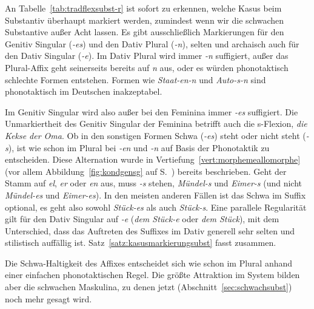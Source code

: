 An Tabelle~\ref{tab:tradflexsubst-r} ist sofort zu erkennen, welche Kasus beim Substantiv überhaupt markiert werden, zumindest wenn wir die schwachen Substantive außer Acht lassen.
Es gibt ausschließlich Markierungen für den Genitiv Singular (\textit{-es}) und den Dativ Plural (\textit{-n}), selten und archaisch auch für den Dativ Singular (\textit{-e}).
Im Dativ Plural wird immer \textit{-n} suffigiert, außer das Plural-Affix geht seinerseits bereits auf \textit{n} aus, oder es würden phonotaktisch schlechte Formen entstehen.
Formen wie \textit{\Ast Staat-en-n} und \textit{\Ast Auto-s-n} sind phonotaktisch im Deutschen inakzeptabel.

Im Genitiv Singular wird also außer bei den Feminina immer \textit{-es} suffigiert.
Die Unmarkiertheit des Genitiv Singular der Feminina betrifft auch die s-Flexion, \zB \textit{die Kekse der Oma}.
Ob in den sonstigen Formen Schwa (\textit{-es}) steht oder nicht steht (\textit{-s}), ist wie schon im Plural bei \textit{-en} und \textit{-n} auf Basis der Phonotaktik zu entscheiden.
Diese Alternation wurde in Vertiefung~\ref{vert:morphemeallomorphe} (vor allem Abbildung~\ref{fig:kondgensg} auf S.~\pageref{fig:kondgensg}) bereits beschrieben.
Geht der Stamm auf \textit{el}, \textit{er} oder \textit{en} aus, muss \textit{-s} stehen, \zB \textit{Mündel-s} und \textit{Eimer-s} (und nicht \textit{\Ast Mündel-es} und \textit{\Ast Eimer-es}).
In den meisten anderen Fällen ist das Schwa im Suffix optional, es geht also sowohl \textit{Stück-es} als auch \textit{Stück-s}.
Eine parallele Regularität gilt für den Dativ Singular auf \textit{-e} (\textit{dem Stück-e} oder \textit{dem Stück}), mit dem Unterschied, dass das Auftreten des Suffixes im Dativ generell sehr selten und stilistisch auffällig ist.
Satz~\ref{satz:kasusmarkierungsubst} fasst zusammen.

\Stretch[0.5]


\Stretch[0.5]

Die Schwa-Haltigkeit des Affixes entscheidet sich wie schon im Plural anhand einer einfachen phonotaktischen Regel.
Die größte Attraktion im System bilden aber die schwachen Maskulina, zu denen jetzt (Abschnitt~\ref{sec:schwachsubst}) noch mehr gesagt wird.

